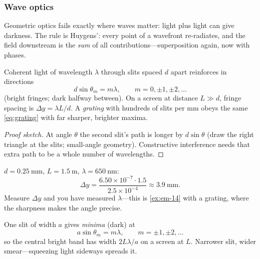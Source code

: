 \subsubsection{Wave optics}

Geometric optics fails exactly where waves matter: light plus light can give darkness. The rule is Huygens': every point of a wavefront re-radiates, and the field downstream is the \emph{sum} of all contributions---superposition again, now with phases.

\begin{theorem}\label{thm:grating}
Coherent light of wavelength $\lambda$ through slits spaced $d$ apart reinforces in directions
\begin{equation}\label{eq:grating}
  d\sin\theta_m = m\lambda, \qquad m = 0, \pm 1, \pm 2, \ldots
\end{equation}
(bright fringes; dark halfway between). On a screen at distance $L \gg d$, fringe spacing is $\Delta y = \lambda L/d$. A \emph{grating} with hundreds of slits per mm obeys the same \cref{eq:grating} with far sharper, brighter maxima.
\end{theorem}

\begin{proof}[Proof sketch]
At angle $\theta$ the second slit's path is longer by $d\sin\theta$ (draw the right triangle at the slits; small-angle geometry). Constructive interference needs that extra path to be a whole number of wavelengths. \qedhere
\end{proof}

\begin{example}\label{exm:fringes}
$d = 0.25\ \mathrm{mm}$, $L = 1.5\ \mathrm{m}$, $\lambda = 650\ \mathrm{nm}$:
\[
  \Delta y = \frac{6.50\times 10^{-7}\cdot 1.5}{2.5\times 10^{-4}} \approx 3.9\ \mathrm{mm}.
\]
Measure $\Delta y$ and you have measured $\lambda$---this is \cref{ex:em-14} with a grating, where the sharpness makes the angle precise.
\end{example}

\begin{proposition}\label{prop:singleslit}
One slit of width $a$ gives \emph{minima} (dark) at
\begin{equation}\label{eq:singleslit}
  a\sin\theta_m = m\lambda, \qquad m = \pm 1, \pm 2, \ldots
\end{equation}
so the central bright band has width $2L\lambda/a$ on a screen at $L$. Narrower slit, wider smear---squeezing light sideways spreads it.
\end{proposition}

